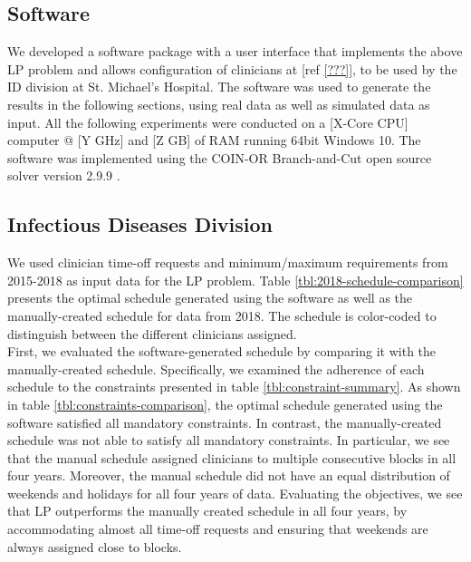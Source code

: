 \subsection{Software}
We developed a software package with a user interface that implements the above LP problem and allows configuration of clinicians at [ref \ref{???}], to be used by the ID division at St. Michael's Hospital. The software was used to generate the results in the following sections, using real data as well as simulated data as input. All the following experiments were conducted on a [X-Core CPU] computer @ [Y GHz] and [Z GB] of RAM running 64bit Windows 10. The software was implemented using the COIN-OR Branch-and-Cut open source solver version 2.9.9 \cite{johnjforrest_coin-or/cbc:_2019}.

\subsection{Infectious Diseases Division}  %
We used clinician time-off requests and minimum/maximum requirements from 2015-2018 as input data for the LP problem. Table \ref{tbl:2018-schedule-comparison} presents the optimal schedule generated using the software as well as the manually-created schedule for data from 2018. The schedule is color-coded to distinguish between the different clinicians assigned. \\



First, we evaluated the software-generated schedule by comparing it with the manually-created schedule. Specifically, we examined the adherence of each schedule to the constraints presented in table \ref{tbl:constraint-summary}. As shown in table \ref{tbl:constraints-comparison}, the optimal schedule generated using the software satisfied all mandatory constraints. In contrast, the manually-created schedule was not able to satisfy all mandatory constraints. In particular, we see that the manual schedule assigned clinicians to multiple consecutive blocks in all four years. Moreover, the manual schedule did not have an equal distribution of weekends and holidays for all four years of data. Evaluating the objectives, we see that LP outperforms the manually created schedule in all four years, by accommodating almost all time-off requests and ensuring that weekends are always assigned close to blocks. \\




